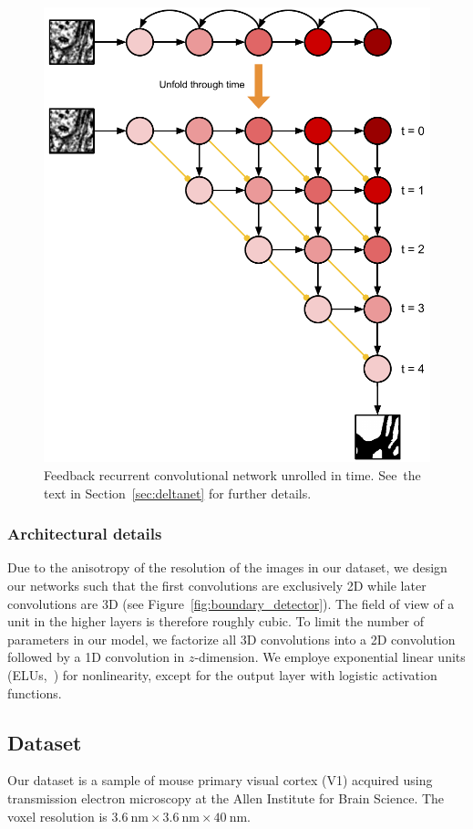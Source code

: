 \documentclass{article}
\begin{document}
\begin{figure}[!t]
\centering
\includegraphics[width=0.65\linewidth]{unfold.pdf}

\caption{Feedback recurrent convolutional network unrolled in time.
See~the text in Section~\ref{sec:deltanet} for further details.}

\label{fig:unfold}
\end{figure}

\subsubsection{Architectural details} Due to the anisotropy of the resolution of
the images in our dataset, we design our networks such that the first
convolutions are exclusively 2D while later convolutions are 3D (see Figure~\ref{fig:boundary_detector}). The field of
view of a unit in the higher layers is therefore roughly cubic. To limit the
number of parameters in our model, we factorize all 3D convolutions into a 2D
convolution followed by a 1D convolution in $z$-dimension. We employe
exponential linear units (ELUs,~\cite{elu}) for nonlinearity, except for the
output layer with logistic activation functions.

\subsection{Dataset}
Our dataset is a sample of mouse primary visual cortex (V1) acquired using
transmission electron microscopy at the Allen Institute for Brain Science. The
voxel resolution is $3.6~\text{nm} \times 3.6~\text{nm} \times 40~\text{nm}$.
\end{document}

